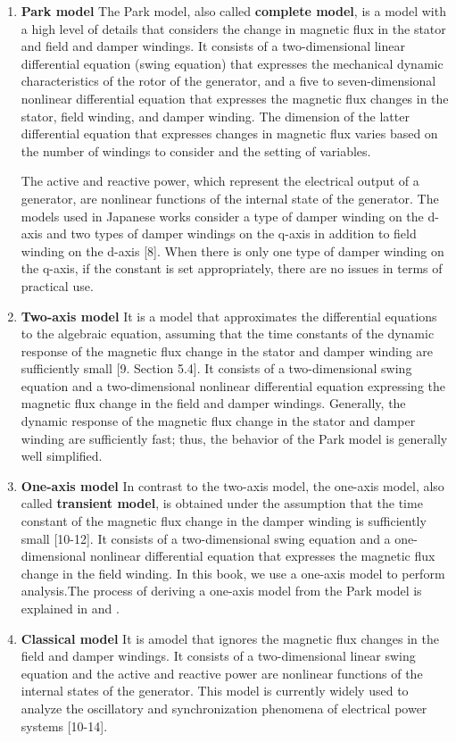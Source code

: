 \documentclass[graybox, envcountchap]{svmult}
\begin{document}
\smallskip
\begin{enumerate}[label=\textbf{(\alph*)}]
  \item \textbf{Park model} The Park model, also called \textbf{complete model},
  is a model with a high level of details that considers the change in magnetic
  flux in the stator and field and damper windings.  It consists of a
  two-dimensional linear differential equation (swing equation) that expresses
  the mechanical dynamic characteristics of the rotor of the generator, and a
  five to seven-dimensional nonlinear differential equation that expresses the
  magnetic flux changes in the stator, field winding, and damper winding.  The
  dimension of the latter differential equation that expresses changes in
  magnetic flux varies based on the number of windings to consider and the
  setting of variables. 

  The active and reactive power, which represent the electrical output of a
  generator, are nonlinear functions of the internal state of the generator. The
  models used in Japanese works consider a type of damper winding on the d-axis
  and two types of damper windings on the q-axis in addition to field winding on
  the d-axis [8].  When there is only one type of damper winding on the q-axis, if
  the constant is set appropriately, there are no issues in terms of practical
  use.
  \bigskip
  \item \textbf{Two-axis model} It is a model that approximates the differential
  equations to the algebraic equation, assuming that the time constants of the
  dynamic response of the magnetic flux change in the stator and damper winding
  are sufficiently small [9. Section 5.4]. It consists of a two-dimensional
  swing equation and a two-dimensional nonlinear differential equation
  expressing the magnetic flux change in the field and damper windings.
  Generally, the dynamic response of the magnetic flux change in the stator and
  damper winding are sufficiently fast; thus, the behavior of the Park model is
  generally well simplified.
  \bigskip
  \item \textbf{One-axis model} In contrast to the two-axis model, the one-axis
  model, also called \textbf{transient model}, is obtained under the assumption
  that the time constant of the magnetic flux change in the damper winding is
  sufficiently small [10-12]. It consists of a two-dimensional swing equation
  and a one-dimensional nonlinear differential equation that expresses the
  magnetic flux change in the field winding. In this book, we use a one-axis
  model to perform analysis.The process of deriving a one-axis model from the
  Park model is explained in \cite[Section 5]{sauer2017power} and \cite[Section
  4.15]{anderson2008power}.
  \bigskip
  \item \textbf{Classical model} It is amodel that ignores the magnetic flux
  changes in the field and damper windings. It consists of a two-dimensional
  linear swing equation and the active and reactive power are nonlinear
  functions of the internal states of the generator. This model is currently
  widely used to analyze the oscillatory and synchronization phenomena of
  electrical power systems [10-14].
\end{enumerate}
\end{document}

